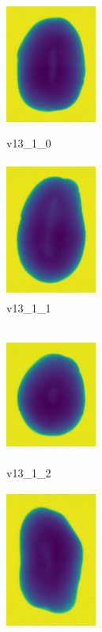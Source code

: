\documentclass[11pt]{article}
\begin{document}
\begin{figure}
     \centering
     \begin{subfigure}[b]{0.15\textwidth}
         \centering
         \includegraphics[width=3cm, height=4.5cm]{images/kartofler/v13_1_0_cut.png}
         \caption{v13\_1\_0}
         \label{fig:y equals x}
     \end{subfigure}
     \hfill
     \begin{subfigure}[b]{0.15\textwidth}
         \centering
         \includegraphics[width=3cm, height=4.5cm]{images/kartofler/v13_1_1_cut.png}
        \caption{v13\_1\_1}
         \label{fig:three sin x}
     \end{subfigure}
     \hfill
     \begin{subfigure}[b]{0.15\textwidth}
         \centering
         \includegraphics[width=3cm, height=4.5cm]{images/kartofler/v13_1_2_cut.png}
        \caption{v13\_1\_2}
         \label{fig:five over x}
     \end{subfigure}
     \hfill
    \begin{subfigure}[b]{0.15\textwidth}
         \centering
         \includegraphics[width=3cm, height=4.5cm]{images/kartofler/v13_1_3_cut.png}

\end{subfigure}
\end{figure}
\end{document}
